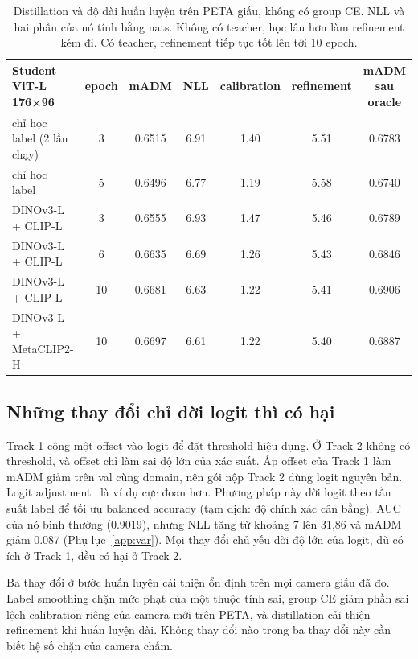 \documentclass[11pt,a4paper]{article}
\begin{document}
\begin{table}[H]
\centering\small
\begin{tabular}{@{}lcccccc@{}}
\toprule
Student ViT-L 176×96 & epoch & mADM & NLL & calibration & refinement & mADM sau oracle \\
\midrule
chỉ học label (2 lần chạy) & 3 & 0.6515 & 6.91 & 1.40 & 5.51 & 0.6783 \\
chỉ học label & 5 & 0.6496 & 6.77 & 1.19 & 5.58 & 0.6740 \\
DINOv3-L + CLIP-L & 3 & 0.6555 & 6.93 & 1.47 & 5.46 & 0.6789 \\
DINOv3-L + CLIP-L & 6 & 0.6635 & 6.69 & 1.26 & 5.43 & 0.6846 \\
DINOv3-L + CLIP-L & 10 & 0.6681 & 6.63 & 1.22 & 5.41 & 0.6906 \\
DINOv3-L + MetaCLIP2-H & 10 & 0.6697 & 6.61 & 1.22 & 5.40 & 0.6887 \\
\bottomrule
\end{tabular}
\caption{Distillation và độ dài huấn luyện trên PETA giấu, không có group CE. NLL và hai phần của nó tính bằng nats. Không có teacher, học lâu hơn làm refinement kém đi. Có teacher, refinement tiếp tục tốt lên tới 10 epoch.}
\label{tab:kd}
\end{table}

\subsection{Những thay đổi chỉ dời logit thì có hại}

Track 1 cộng một offset vào logit để đặt threshold hiệu dụng. Ở Track 2 không có threshold, và offset chỉ làm sai độ lớn của xác suất. Áp offset của Track 1 làm mADM giảm trên val cùng domain, nên gói nộp Track 2 dùng logit nguyên bản. Logit adjustment~\cite{logitadj} là ví dụ cực đoan hơn. Phương pháp này dời logit theo tần suất label để tối ưu balanced accuracy (tạm dịch: độ chính xác cân bằng). AUC của nó bình thường (0.9019), nhưng NLL tăng từ khoảng 7 lên 31,86 và mADM giảm 0.087 (Phụ lục~\ref{app:var}). Mọi thay đổi chủ yếu dời độ lớn của logit, dù có ích ở Track 1, đều có hại ở Track 2.

\begin{ghichu}
Ba thay đổi ở bước huấn luyện cải thiện ổn định trên mọi camera giấu đã đo. Label smoothing chặn mức phạt của một thuộc tính sai, group CE giảm phần sai lệch calibration riêng của camera mới trên PETA, và distillation cải thiện refinement khi huấn luyện dài. Không thay đổi nào trong ba thay đổi này cần biết hệ số chặn của camera chấm.
\end{ghichu}
\end{document}
